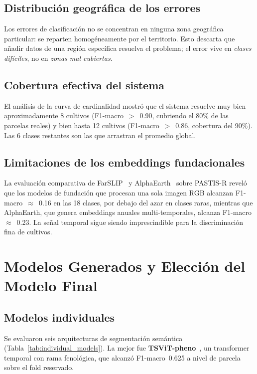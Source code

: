 \documentclass{article}
\begin{document}
\subsection{Distribución geográfica de los errores}
Los errores de clasificación no se concentran en ninguna zona geográfica
particular: se reparten homogéneamente por el territorio. Esto descarta
que añadir datos de una región específica resuelva el problema; el error
vive en \textit{clases difíciles}, no en \textit{zonas mal cubiertas}.

\subsection{Cobertura efectiva del sistema}
El análisis de la curva de cardinalidad mostró que el sistema resuelve
muy bien aproximadamente 8 cultivos (F1-macro~$>$~0.90, cubriendo el 80\%
de las parcelas reales) y bien hasta 12 cultivos (F1-macro~$>$~0.86,
cobertura del 90\%). Las 6 clases restantes son las que arrastran el
promedio global.

\subsection{Limitaciones de los embeddings fundacionales}
La evaluación comparativa de FarSLIP~\cite{li2025farslip} y
AlphaEarth~\cite{khanna2023alphaearth} sobre PASTIS-R reveló que los
modelos de fundación que procesan una sola imagen RGB alcanzan
F1-macro~$\approx$~0.16 en las 18 clases, por debajo del azar en clases
raras, mientras que AlphaEarth, que genera embeddings anuales
multi-temporales, alcanza F1-macro~$\approx$~0.23. La señal temporal sigue
siendo imprescindible para la discriminación fina de cultivos.

\section{Modelos Generados y Elección del Modelo Final}

\subsection{Modelos individuales}

Se evaluaron seis arquitecturas de segmentación semántica
(Tabla~\ref{tab:individual_models}). La mejor fue
\textbf{TSViT-pheno}~\cite{nyborg2022tsvit}, un transformer temporal con
rama fenológica, que alcanzó F1-macro~0.625 a nivel de parcela sobre el
fold reservado.
\end{document}
